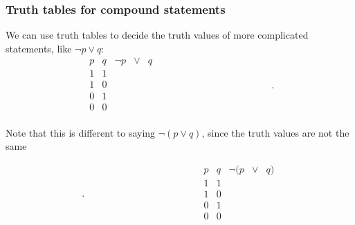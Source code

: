 \documentclass[10pt]{beamer}
\theoremstyle{definition}
\begin{document}
\begin{frame}
\frametitle{Truth tables for compound statements}



We can use truth tables to decide the truth values of more complicated statements, like $\neg p\vee q$:
\[\begin{array}{c|c|ccc}
 p & q & \neg p & \vee & q\\
 \hline
 1 & 1 & & \\
 1 & 0 &  & \\
 0& 1  &  & \\
 0 & 0 &  & \\
\end{array} \hspace{5cm}.\]

\bigskip
\pause Note that this is different to saying $\neg(p\vee q)$, since the truth values are not the same %


\vspace{-4.8cm}\[.\hspace{5cm}\begin{array}{c|c|ccc}
 p & q & \neg (p & \vee & q)\\
 \hline
 1 & 1 & & \\
 1 & 0 &  & \\
 0& 1  &  & \\
 0 & 0 &  & \\
\end{array} \]
\vspace{2cm}
\vfill
\end{frame}



%
%
%
%
%
%
%
%
\end{document}
